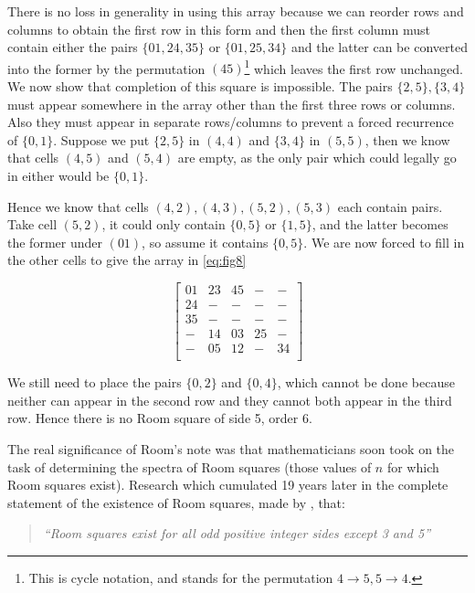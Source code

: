 \documentclass[
  11pt,
  a4paper]{book}
\begin{document}
There is no loss in generality in using this array because we can
reorder rows and columns to obtain the first row in this form and then
the first column must contain either the pairs \(\{01, 24, 35\}\) or
\(\{01, 25, 34\}\) and the latter can be converted into the former by the
permutation \((45)\)\footnote{This is cycle notation, and stands for the permutation
  \(4 \rightarrow 5, 5 \rightarrow 4\).} which leaves the first row unchanged. We now show
that completion of this square is impossible. The pairs
\(\{2,5\},\{3,4\}\) must appear somewhere in the array other than the
first three rows or columns. Also they must appear in separate
rows/columns to prevent a forced recurrence of \(\{0, 1\}\). Suppose we put
\(\{2, 5\}\) in \((4, 4)\) and \(\{3, 4\}\) in \((5, 5)\), then we know that cells
\((4, 5)\) and \((5, 4)\) are empty, as the only pair which could legally go
in either would be \(\{0, 1\}\).

Hence we know that cells \((4, 2), (4, 3), (5, 2), (5, 3)\) each contain pairs.
Take cell \((5, 2)\), it could only contain \(\{0, 5\}\) or \(\{1, 5\}\), and the
latter becomes the former under \((01)\), so assume it contains \(\{0, 5\}\).
We are now forced to fill in the other cells to give the array in
\eqref{eq:fig8}

\begin{equation}
  \label{eq:fig8}
  \begin{bmatrix}
    01 & 23 & 45 &  - & -  \\
    24 &  - &  - &  - & -  \\
    35 &  - &  - &  - & -  \\
     - & 14 & 03 & 25 & -  \\
     - & 05 & 12 &  - & 34 \\
  \end{bmatrix}
\end{equation}

We still need to place the pairs \(\{0, 2\}\) and \(\{0, 4\}\), which cannot
be done because neither can appear in the second row and they cannot
both appear in the third row. Hence there is no Room square of side 5,
order 6.

The real significance of Room's note was that mathematicians soon took
on the task of determining the spectra of Room squares (those values of
\(n\) for which Room squares exist). Research which cumulated 19 years
later in the complete statement of the existence of Room squares, made
by \textcite{wallis_solution_1974}, that:

\begin{quote}
\emph{``Room squares exist for all odd positive integer sides except 3
and 5''}
\end{quote}
\end{document}
